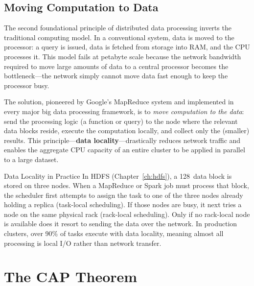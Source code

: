\subsection{Moving Computation to Data}
\label{subsec:comp-to-data}

The second foundational principle of distributed data processing inverts
the traditional computing model. In a conventional system, data is moved
to the processor: a query is issued, data is fetched from storage into
RAM, and the CPU processes it. This model fails at petabyte scale because
the network bandwidth required to move large amounts of data to a central
processor becomes the bottleneck---the network simply cannot move data
fast enough to keep the processor busy.

The solution, pioneered by Google's MapReduce system \parencite{MapReduce2004}
and implemented in every major big data processing framework, is to
\emph{move computation to the data}: send the processing logic (a
function or query) to the node where the relevant data blocks reside,
execute the computation locally, and collect only the (smaller) results.
This principle---\textbf{data locality}---drastically reduces network
traffic and enables the aggregate CPU capacity of an entire cluster to be
applied in parallel to a large dataset.

\begin{systemdesign}{Data Locality in Practice}
In HDFS (Chapter~\ref{ch:hdfs}), a 128\MB\ data block is stored on three
nodes. When a MapReduce or Spark job must process that block, the
scheduler first attempts to assign the task to one of the three nodes
already holding a replica (task-local scheduling). If those nodes are
busy, it next tries a node on the same physical rack (rack-local
scheduling). Only if no rack-local node is available does it resort to
sending the data over the network. In production clusters, over 90\% of
tasks execute with data locality, meaning almost all processing is local
I/O rather than network transfer.
\end{systemdesign}

\section{The CAP Theorem}
\label{sec:cap}

